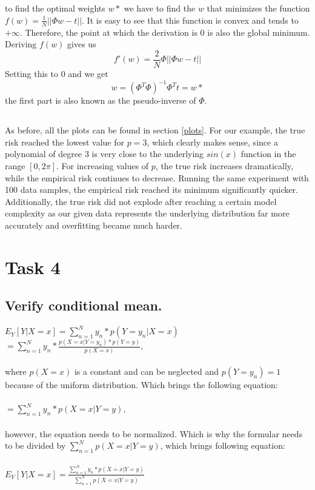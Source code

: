 \documentclass{article}
\begin{document}
\subsection{}
to find the optimal weights $w*$ we have to find the $w$ that minimizes the function $f(w)=\frac{1}{N}||\Phi w-t||$. It is easy to see that this function is convex and tends to $+\infty$. Therefore, the point at which the derivation is 0 is also the global minimum. Deriving $f(w)$ gives us 
$$f'(w)=\frac{2}{N}\Phi ||\Phi w-t||$$
Setting this to 0 and we get 
$$w=(\Phi^T\Phi)^{-1}\Phi^Tt=w*$$
the first part is also known as the pseudo-inverse of $\Phi$.

\subsection{}
As before, all the plots can be found in section \ref{plots}.
For our example, the true risk reached the lowest value for $p=3$, which clearly makes sense, since a polynomial of degree 3 is very close to the underlying $sin(x)$ function in the range $[0, 2\pi]$. For increasing values of $p$, the true risk increases dramatically, while the empirical risk continues to decrease.
Running the same experiment with 100 data samples, the empirical risk reached its minimum significantly quicker. Additionally, the true risk did not explode after reaching a certain model complexity as our given data represents the underlying distribution far more accurately and overfitting became much harder.

\section{Task 4}
\subsection{Verify conditional mean.}
$E_Y [Y | X = x] = \sum_{n=1}^{N} y_n * p(Y = y_n | X = x)$\\
$ = \sum_{n=1}^{N} y_n * \frac{p(X = x | Y = y_n) * p(Y = y)}{p(X=x)},$\\\\
where $p(X = x)$ is a constant and can be neglected and $p(Y = y_n) = 1$ because of the uniform distribution. Which brings the following equation:\\\\
$ = \sum_{n=1}^{N} y_n * p(X = x | Y = y),$\\\\
however, the equation needs to be normalized. Which is why the formular needs to be divided by $\sum_{n=1}^{N} p(X = x | Y = y)$, which brings following equation:\\\\
$E_Y [Y | X = x] = \frac{\sum_{n=1}^{N} y_n *  p(X = x | Y = y)}{\sum_{n=1}^{N} p(X = x | Y = y)}$
\end{document}
